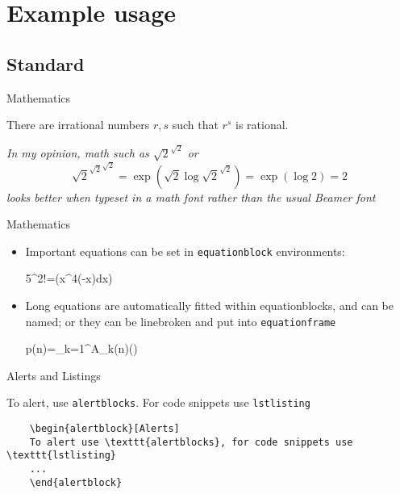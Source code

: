 \documentclass{beamer}
\begin{document}
\section{Example usage}
\subsection{Standard}

\begin{frame}{Mathematics}
\begin{theorem}
	There are irrational numbers $r,s$ such that $r^s$ is rational.
\end{theorem}
\textit{In my opinion, math such as $\sqrt{2}^{\sqrt{2}}$ or 
 $$
 {\sqrt{2}^{\sqrt{2}}}^{\sqrt{2}}=\exp(\sqrt{2}\log\sqrt{2}^{\sqrt{2}})=\exp(\log{2})=2
 $$ looks better when typeset in a math font rather than the usual Beamer font}\hfill\qedsymbol
\end{frame}
\begin{frame}{Mathematics}
\begin{itemize}
	\item Important equations can be set in \texttt{equationblock} environments:
	\begin{equationblock}
		5^2!=\exp\left(\int x^4\exp(-x)\;dx\right)
	\end{equationblock}	
	\item Long equations are automatically fitted within equationblocks, and can be named; or they can be linebroken and put into \texttt{equationframe}
	\begin{equationblock}
		p(n)=\sum_{k=1}^{\infty}A_{k}(n)\left(\sinh{}\right)
	\end{equationblock}
\end{itemize}
\end{frame}

\begin{frame}[fragile]{Alerts and Listings}
\begin{alertblock}
	To alert, use \texttt{alertblocks}. For code snippets use \texttt{lstlisting}
	\begin{lstlisting}
	\begin{alertblock}[Alerts]
	To alert use \texttt{alertblocks}, for code snippets use \texttt{lstlisting}
	...
	\end{alertblock}
	\end{lstlisting}
\end{alertblock}
\end{frame}
\end{document}

